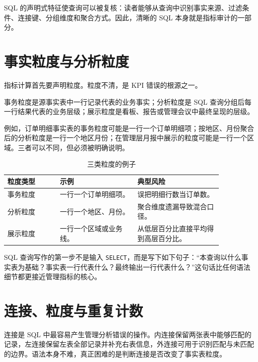 \documentclass[UTF8,fontset=fandol,openany,zihao=-4]{ctexbook}
\begin{document}
\begin{proposition}[声明式查询与可审计性]
SQL 的声明式特征使查询可以被复核：读者能够从查询中识别事实来源、过滤条件、连接键、分组维度和聚合方式。因此，清晰的 SQL 本身就是指标审计的一部分。
\end{proposition}

\section{事实粒度与分析粒度}

指标计算首先要声明粒度。粒度不清，是 KPI 错误的根源之一。

\begin{definition}
事务粒度是源事实表中一行记录代表的业务事实；分析粒度是 SQL 查询分组后每一行结果代表的业务层级；展示粒度是看板、报告或管理会议中最终呈现的层级。
\end{definition}

例如，订单明细事实表的事务粒度可能是一行一个订单明细项；按地区、月份聚合后的分析粒度是一行一个地区月份；在管理层月报中展示的粒度可能是一行一个区域。三者可以不同，但必须被明确说明。

\begin{table}[htbp]
\centering
\caption{三类粒度的例子}
\begin{tabular}{p{0.21\linewidth}p{0.31\linewidth}p{0.34\linewidth}}
\toprule
粒度类型 & 示例 & 典型风险\\
\midrule
事务粒度 & 一行一个订单明细项。 & 误把明细行数当订单数。\\
分析粒度 & 一行一个地区、月份。 & 聚合维度遗漏导致混合口径。\\
展示粒度 & 一行一个区域或业务线。 & 从低层百分比直接平均得到高层百分比。\\
\bottomrule
\end{tabular}
\end{table}

SQL 查询写作的第一步不是输入 \texttt{SELECT}，而是写下如下句子：“本查询以什么事实表为基础？事实表一行代表什么？最终输出一行代表什么？”这句话比任何语法细节都更接近管理指标的核心。

\section{连接、粒度与重复计数}

连接是 SQL 中最容易产生管理分析错误的操作。内连接保留两张表中能够匹配的记录，左连接保留左表全部记录并补充右表信息，外连接可用于识别匹配与未匹配的边界。语法本身不难，真正困难的是判断连接是否改变了事实表粒度。
\end{document}
